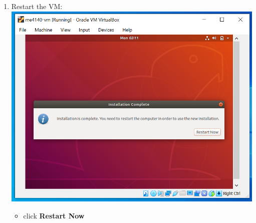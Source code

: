 \documentclass[12pt]{article}
\begin{document}
\begin{description}
\begin{description}
\begin{enumerate}[label=\alph*)]
\vspace{5mm} 
\item Restart the VM: \vspace{5mm} \\
	\hspace*{-2.5cm}\includegraphics[scale=.6]{Capture21.png}  
    \begin{itemize}
        \item click {\bf Restart Now}
    \end{itemize}        

\newpage  


\end{enumerate}
\end{description}
\end{description}
\end{document}
